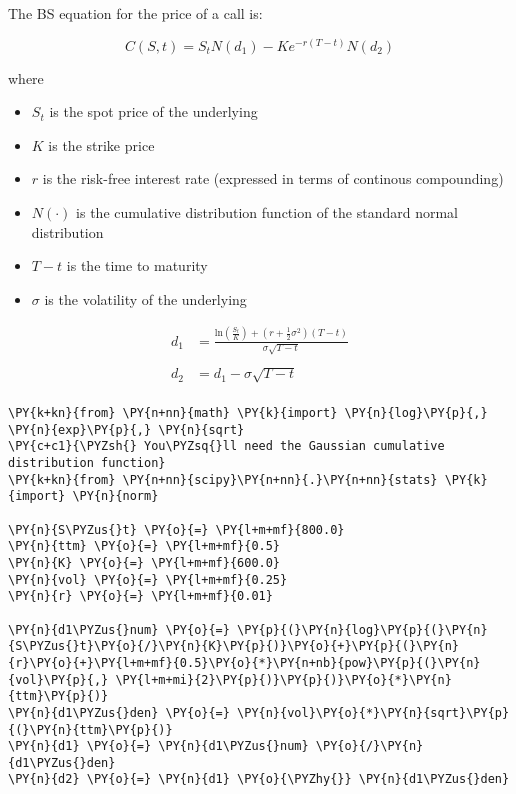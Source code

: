 \begin{Answer}
The BS equation for the price of a call is:

\[ C(S, t) = S_tN(d_1)-Ke^{-r(T-t)}N(d_2) \]

where
\begin{itemize}
\item \(S_t\) is the spot price of the underlying
\item \(K\) is the strike price
\item \(r\) is the risk-free interest rate (expressed in terms of continous compounding)
\item \(N(\cdot)\) is the cumulative distribution function of the standard normal distribution
\item \(T - t\) is the time to maturity
\item \(\sigma\) is the volatility of the underlying
\end{itemize}

\[\begin{split}
d_1 & = \frac{\mathrm{ln}(\frac{S_t}{K}) + (r + \frac{1}{2}\sigma^{2})(T-t)}{\sigma\sqrt{T-t}}\\ \\
d_2 & = d_1 - \sigma\sqrt{T-t}\\
\end{split}\]

\begin{tcolorbox}[size=fbox, boxrule=1pt, colback=cellbackground, colframe=cellborder]
\begin{Verbatim}[commandchars=\\\{\}]
\PY{k+kn}{from} \PY{n+nn}{math} \PY{k}{import} \PY{n}{log}\PY{p}{,} \PY{n}{exp}\PY{p}{,} \PY{n}{sqrt}
\PY{c+c1}{\PYZsh{} You\PYZsq{}ll need the Gaussian cumulative distribution function}
\PY{k+kn}{from} \PY{n+nn}{scipy}\PY{n+nn}{.}\PY{n+nn}{stats} \PY{k}{import} \PY{n}{norm}

\PY{n}{S\PYZus{}t} \PY{o}{=} \PY{l+m+mf}{800.0}
\PY{n}{ttm} \PY{o}{=} \PY{l+m+mf}{0.5}
\PY{n}{K} \PY{o}{=} \PY{l+m+mf}{600.0}
\PY{n}{vol} \PY{o}{=} \PY{l+m+mf}{0.25}
\PY{n}{r} \PY{o}{=} \PY{l+m+mf}{0.01}

\PY{n}{d1\PYZus{}num} \PY{o}{=} \PY{p}{(}\PY{n}{log}\PY{p}{(}\PY{n}{S\PYZus{}t}\PY{o}{/}\PY{n}{K}\PY{p}{)}\PY{o}{+}\PY{p}{(}\PY{n}{r}\PY{o}{+}\PY{l+m+mf}{0.5}\PY{o}{*}\PY{n+nb}{pow}\PY{p}{(}\PY{n}{vol}\PY{p}{,} \PY{l+m+mi}{2}\PY{p}{)}\PY{p}{)}\PY{o}{*}\PY{n}{ttm}\PY{p}{)}
\PY{n}{d1\PYZus{}den} \PY{o}{=} \PY{n}{vol}\PY{o}{*}\PY{n}{sqrt}\PY{p}{(}\PY{n}{ttm}\PY{p}{)}
\PY{n}{d1} \PY{o}{=} \PY{n}{d1\PYZus{}num} \PY{o}{/}\PY{n}{d1\PYZus{}den}
\PY{n}{d2} \PY{o}{=} \PY{n}{d1} \PY{o}{\PYZhy{}} \PY{n}{d1\PYZus{}den}          


\end{Verbatim}
\end{tcolorbox}
\end{Answer}
